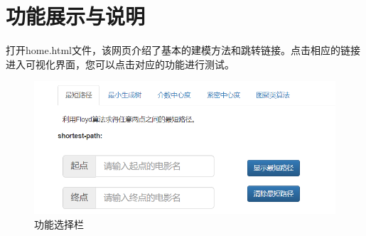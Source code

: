 \documentclass[UTF8, onecolumn, a4paper]{article}
\begin{document}
\section{功能展示与说明}
打开home.html文件，该网页介绍了基本的建模方法和跳转链接。点击相应的链接进入可视化界面，您可以点击对应的功能进行测试。
\begin{figure}[htb]
	\centering
	\includegraphics[width=0.6\linewidth]{../pictures/floyd}
	\caption{功能选择栏}
\end{figure}
\end{document}
